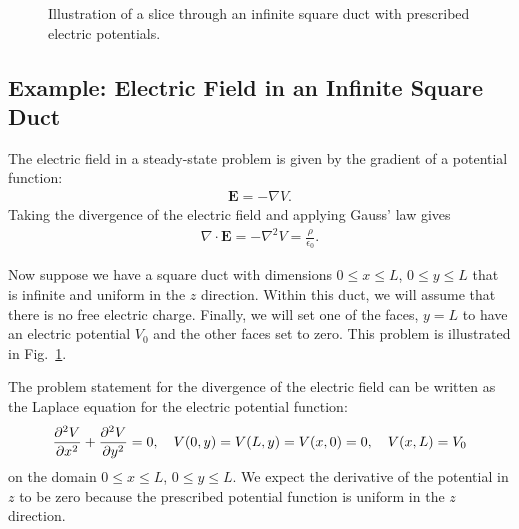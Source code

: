 \begin{figure}[b!]
\begin{center}
\caption{Illustration of a slice through an infinite square duct with prescribed electric potentials.}
\label{Fig:pde_illustration2DSquareCavity}
\end{center}
\end{figure}

\subsection{Example: Electric Field in an Infinite Square Duct}

The electric field in a steady-state problem is given by the gradient of a potential function:
\begin{align}
  \mathbf{E} = -\nabla V.
\end{align}
Taking the divergence of the electric field and applying Gauss' law gives
\begin{align}
  \nabla \cdot \mathbf{E} = -\nabla^2 V = \frac{\rho}{\epsilon_0} .
\end{align}

Now suppose we have a square duct with dimensions $0 \le x \le L$, $0 \le y \le L$ that is infinite and uniform in the $z$ direction. Within this duct, we will assume that there is no free electric charge. Finally, we will set one of the faces, $y = L$ to have an electric potential $V_0$ and the other faces set to zero. This problem is illustrated in Fig.~\ref{Fig:pde_illustration2DSquareCavity}.

The problem statement for the divergence of the electric field can be written as the Laplace equation for the electric potential function:
\begin{align}
  \frac{ \partial^2 {V} }{ \partial {x}^2 } + \frac{ \partial^2 {V} }{ \partial {y}^2 } = 0, \quad V(0,y) = V(L,y) = V(x,0) = 0, \quad V(x,L) = V_0 
\end{align}
on the domain $0 \le x \le L$, $0 \le y \le L$. We expect the derivative of the potential in $z$ to be zero because the prescribed potential function is uniform in the $z$ direction.

